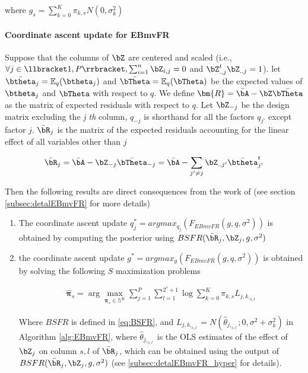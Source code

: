 where $g_s= \sum_{k=0}^K \pi_{k ,s} N(0,\sigma_{k }^2)$
\paragraph{Coordinate ascent update for EBmvFR}

Suppose that the columns of $\bZ$ are centered and scaled (i.e., $\forall j \in \llbracket  1, P\rrbracket ,\sum_{i=1}^n \bZ_{i,j}=0$ and $\bZ_{.,j}^t \bZ_{.,j}=1$). let $\Bar{\btheta}_j = \mathbb{E}_q(\btheta_j)$ and $\Bar{\bTheta}=\mathbb{E}_q(\bTheta)$ be the expected values of $\btheta _j$ and $\bTheta$ with respect to $q$. We define $\bm{R}= \Bar{\bA}- \bZ\Bar{\bTheta}$ as the matrix of expected residuals with respect to $q$. Let $\bZ_{-j}$ be the design matrix excluding the  \textit{j th} column, $q_{-j}$ is shorthand for all the factors $q_{j'}$ except factor $j$. $\Bar{\bR}_j$ is the matrix of the expected residuals accounting for the linear effect of all variables other than $j$

 


\begin{align}
    \bar{\bR}_j= \Bar{\bA} - \bZ_{-j}\Bar{\bTheta}_{-j} = \Bar{\bA} -\sum_{j'\neq j } \bZ_{.,j'} \Bar{\btheta}_{j'}^t
\end{align}

Then the following results are direct consequences from the work of \cite{kim_flexible_2022} (see section \ref{subsec:detalEBmvFR} for more details)


\begin{enumerate}
    \item The coordinate ascent update $q^*_j = argmax_{q_{j}}(F_{EBmvFR}( g,q,\sigma^2))$ is obtained by computing the posterior using $BSFR(\bar{\bR}_j, \bZ_j, g,\sigma^2)$
    \item  the coordinate ascent update 
    $ g^* = argmax_{g}(F_{EBmvFR}( g,q,\sigma^2)) $
    is obtained by solving the following $S$ maximization problems

\begin{align}
    \hat{\bm{\pi}}_s = \arg\max_{\bm{\pi}_s \in \mathbb{S}^K} \sum _{j=1}^P  \sum _{ l=1}^{2^s+1} \log  \sum_{k=0}^K  \pi_{k,s}L_{j,k,_{s,l}}
\end{align}


Where $BSFR$  is defined in \ref{eq:BSFR}, and $L_{j,k,_{s,l}}= N(\hat{\theta}_{j,_{s,l}};0, \sigma^2+\sigma_k^2)$ in Algorithm \ref{alg:EBmvFR}, where $\hat{\theta}_{j,_{s,l}}$ is the OLS estimates of the effect of $\bZ_j$ on column $s,l$ of $\Bar{\bR}_j$, which can be obtained using the output of  $BSFR(\bar{\bR}_j, \bZ_j, g,\sigma^2)$ (see \ref{subsec:detalEBmvFR_hyper} for details).
 
\end{enumerate}
   

